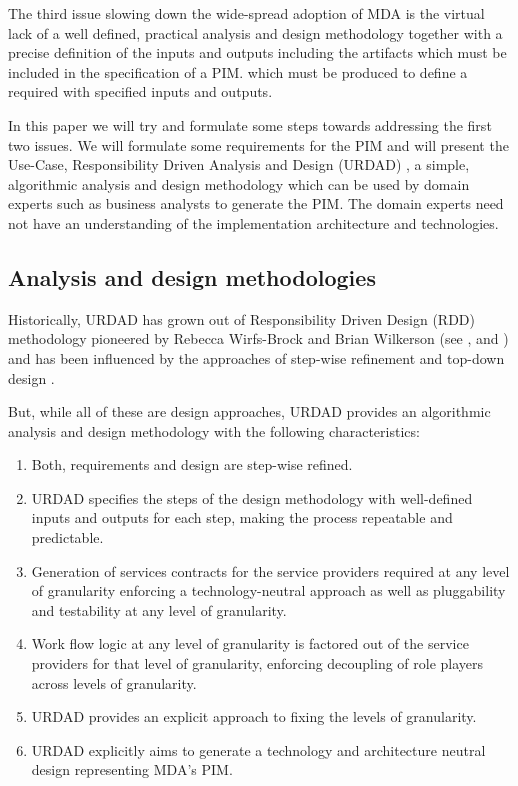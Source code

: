 \documentclass{IOS-Book-Article}
\begin{document}
The third issue slowing down the wide-spread adoption of MDA is the virtual lack of
a well defined, practical analysis and design methodology together with a
precise definition of the inputs and outputs
including the artifacts which must be included in the specification of a PIM.
which must be produced to define a required with specified inputs and outputs.

In this paper we will try and formulate some steps towards addressing the first
two issues. We will formulate some requirements for the PIM and will present
the Use-Case, Responsibility Driven Analysis and Design (URDAD)
\cite{solms:urdad}, a simple, algorithmic analysis and design methodology
which can be used by domain experts such as business analysts to generate the
PIM. The domain experts need not have an understanding of the implementation
architecture and technologies.


\subsection{Analysis and design methodologies}

Historically, URDAD has grown out of Responsibility Driven Design (RDD)
methodology pioneered by Rebecca Wirfs-Brock and Brian Wilkerson (see
\cite{wirfs-brock:responsibilityDrivenApproach},  and
\cite{wirfs-brock:objectDesign} \cite{wirfs-brock:designSimplicity}) and has
been influenced by the approaches of step-wise refinement \cite{wirth:stepWiseRefinement}
and top-down design \cite{martin:agileSoftwareDevelopment}.

But, while all of these are design approaches, URDAD provides an algorithmic
analysis and design methodology with the following characteristics:
\begin{enumerate}
  \item Both, requirements and design are step-wise refined.
  \item URDAD specifies the steps of the design methodology with
			well-defined inputs and outputs for each step, making the process repeatable
			and predictable.
  \item Generation of services contracts for the service providers required at any
			level of granularity enforcing a technology-neutral approach as well as
			pluggability and testability at any level of	granularity.
	\item Work flow logic at any level of granularity is factored out of the service
			providers for that level of granularity, enforcing decoupling of role players
			across levels of granularity.
	\item URDAD provides an explicit approach to fixing the levels of granularity.
   \item URDAD explicitly aims to generate a technology and architecture neutral design
			representing MDA's PIM.
\end{enumerate}
\end{document}
